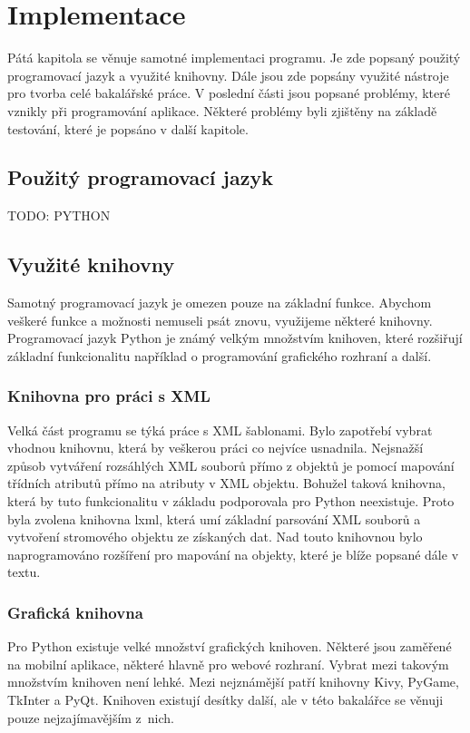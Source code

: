 \documentclass[thesis=B,czech]{resources/FITthesis}[2012/06/26]
\begin{document}
\chapter{Implementace}
Pátá kapitola se věnuje samotné implementaci programu. Je zde popsaný použitý programovací jazyk a využité knihovny.  Dále jsou zde popsány využité nástroje pro tvorba celé bakalářské práce. V poslední části jsou popsané problémy, které vznikly při programování aplikace. Některé problémy byli zjištěny na základě testování, které je popsáno v další kapitole.
\section{Použitý programovací jazyk}
TODO: PYTHON

\section{Využité knihovny}
Samotný programovací jazyk je omezen pouze na základní funkce. Abychom veškeré funkce a možnosti nemuseli psát znovu, využijeme některé knihovny. Programovací jazyk Python je známý velkým množstvím knihoven, které rozšiřují základní funkcionalitu například o programování grafického rozhraní a další. 
\subsection{Knihovna pro práci s XML}

Velká část programu se týká práce s XML šablonami. Bylo zapotřebí vybrat vhodnou knihovnu, která by veškerou práci co nejvíce usnadnila. Nejsnažší způsob vytváření rozsáhlých XML souborů přímo z objektů je pomocí mapování třídních atributů přímo na atributy v XML objektu. Bohužel taková knihovna, která by tuto funkcionalitu v základu podporovala pro Python neexistuje. Proto byla zvolena knihovna lxml\cite{lxml}, která umí základní parsování XML souborů a vytvoření stromového objektu ze získaných dat. Nad touto knihovnou bylo naprogramováno rozšíření pro mapování na objekty, které je blíže popsané dále v textu.



\subsection{Grafická knihovna}
Pro Python existuje velké množství grafických knihoven. Některé jsou zaměřené na mobilní aplikace, některé hlavně pro webové rozhraní. Vybrat mezi takovým množstvím knihoven není lehké. Mezi nejznámější patří knihovny Kivy, PyGame, TkInter a PyQt. Knihoven existují desítky další, ale v této bakalářce se věnuji pouze nejzajímavějším z~nich.\par
\end{document}
